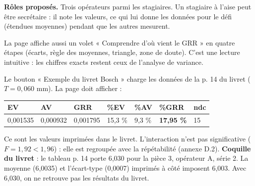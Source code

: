 \documentclass[10pt,a4paper]{article}
\begin{document}
\textbf{Rôles proposés.} Trois opérateurs parmi les stagiaires. Un stagiaire à l'aise peut être secrétaire : il note les valeurs, ce qui lui donne les données pour le défi (étendues moyennes) pendant que les autres mesurent.

{\small La page affiche aussi un volet « Comprendre d'où vient le GRR » en quatre étapes (écarts, règle des moyennes, triangle, zone de doute). C'est une lecture intuitive : les chiffres exacts restent ceux de l'analyse de variance.}\par
Le bouton « Exemple du livret Bosch » charge les données de la p. 14 du livret ($T = 0{,}060$ mm). La page doit afficher :
\begin{center}
\begin{tabular}{@{}lllllll@{}}
\toprule
EV & AV & GRR & \%EV & \%AV & \%GRR & ndc\\\midrule
0,001535 & 0,000932 & 0,001795 & 15,3 \% & 9,3 \% & \textbf{17,95 \%} & 15\\
\bottomrule
\end{tabular}
\end{center}
Ce sont les valeurs imprimées dans le livret. L'interaction n'est pas significative ($F = 1{,}92 < 1{,}96$) : elle est regroupée avec la répétabilité (annexe D.2).
{\small \textbf{Coquille du livret} : le tableau p. 14 porte 6,030 pour la pièce 3, opérateur A, série 2. La moyenne (6,0035) et l'écart-type (0,0007) imprimés à côté imposent 6,003. Avec 6,030, on ne retrouve pas les résultats du livret.}
\end{document}
